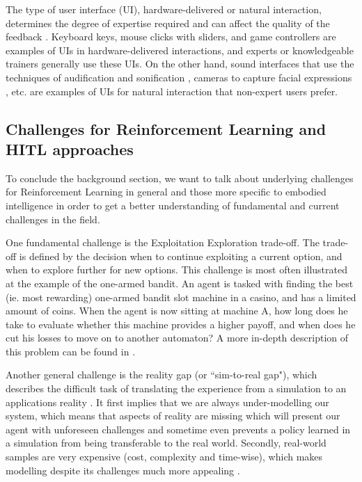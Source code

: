 \documentclass[twoside,11pt]{article}
\begin{document}
The type of user interface (UI), hardware-delivered or natural interaction,  determines the degree of expertise required and can affect the quality of the feedback \citep{lin:20}. Keyboard keys, mouse clicks with sliders, and game controllers are examples of UIs in hardware-delivered interactions, and experts or knowledgeable trainers generally use these UIs. On the other hand, sound interfaces that use the techniques of audification and sonification \citep{Hermann:2011:Sonification, Saranti:2009:QuantumHarmonicOscSonification,kartoun:10,Scurto:2021:DesigningDeepRLHumanParameterExploration}, cameras to capture facial expressions \citep{arakawa:18}, etc. are examples of UIs for natural interaction that non-expert users prefer. 

\subsection{Challenges for Reinforcement Learning and HITL approaches}

To conclude the background section, we want to talk about underlying challenges for Reinforcement Learning in general and those more specific to embodied intelligence in order to get a better understanding of fundamental and current challenges in the field.

One fundamental challenge is the Exploitation Exploration trade-off. The trade-off is defined by the decision when to continue exploiting a current option, and when to explore further for new options. This challenge is most often illustrated at the example of the one-armed bandit. An agent is tasked with finding the best (ie. most rewarding) one-armed bandit slot machine in a casino, and has a limited amount of coins. When the agent is now sitting at machine A, how long does he take to evaluate whether this machine provides a higher payoff, and when does he cut his losses to move on to another automaton? A more in-depth description of this problem can be found in \citet{AudibertMunosSzepesv:2009:ExplorationExploitation}.

Another general challenge is the reality gap (or ``sim-to-real gap"), which describes the difficult task of translating the experience from a simulation to an applications reality \citep{ZagalJavierVallejos:2004:RealityGap}. It first implies that we are always under-modelling our system, which means that aspects of reality are missing which will present our agent with unforeseen challenges and sometime even prevents a policy learned in a simulation from being transferable to the real world. Secondly, real-world samples are very expensive (cost, complexity and time-wise), which makes modelling despite its challenges much more appealing  \citep{KoberBagnellPeters:2013:RLRoboticsSurvey}.
\end{document}
